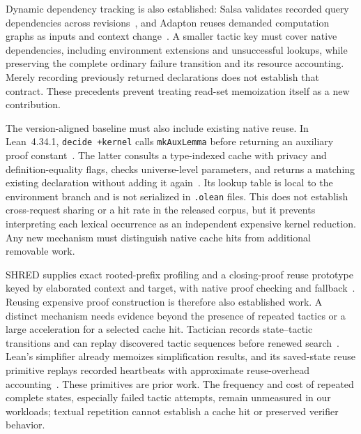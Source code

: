 \documentclass[10pt,twocolumn]{article}
\begin{document}
Dynamic dependency tracking is also established: Salsa validates recorded
query dependencies across revisions~\cite{salsaDependencies}, and Adapton
reuses demanded computation graphs as inputs and context change~\cite{adapton}.
A smaller tactic key must cover native dependencies, including environment
extensions and unsuccessful lookups, while preserving the complete ordinary
failure transition and its resource accounting. Merely recording previously
returned declarations does not establish that contract. These precedents
prevent treating read-set memoization itself as a new contribution.

The version-aligned baseline must also include existing native reuse.
In Lean~4.34.1, \texttt{decide +kernel} calls \texttt{mkAuxLemma} before
returning an auxiliary proof constant~\cite{leanDecide434}.
The latter consults a type-indexed cache with privacy and definition-equality
flags, checks universe-level parameters, and returns a matching existing
declaration without adding it again~\cite{leanAuxLemma434}.
Its lookup table is local to the environment branch and is not serialized
in \texttt{.olean} files. This does not establish cross-request sharing or
a hit rate in the released corpus, but it prevents interpreting each lexical
occurrence as an independent expensive kernel reduction. Any new mechanism
must distinguish native cache hits from additional removable work.

SHRED supplies exact rooted-prefix profiling and a closing-proof reuse prototype
keyed by elaborated context and target, with native proof checking and fallback~\cite{shred}.
Reusing expensive proof construction is therefore also established work.
A distinct mechanism needs evidence beyond the presence of repeated tactics
or a large acceleration for a selected cache hit.
Tactician records state--tactic transitions and can replay discovered tactic
sequences before renewed search~\cite{tactician2020}.
Lean's simplifier already memoizes simplification results, and its saved-state
reuse primitive replays recorded heartbeats with approximate reuse-overhead
accounting~\cite{lean49StateReuse,leanSimpCache}.
These primitives are prior work. The frequency and cost of repeated complete
states, especially failed tactic attempts, remain unmeasured in our workloads;
textual repetition cannot establish a cache hit or preserved verifier behavior.
\end{document}
